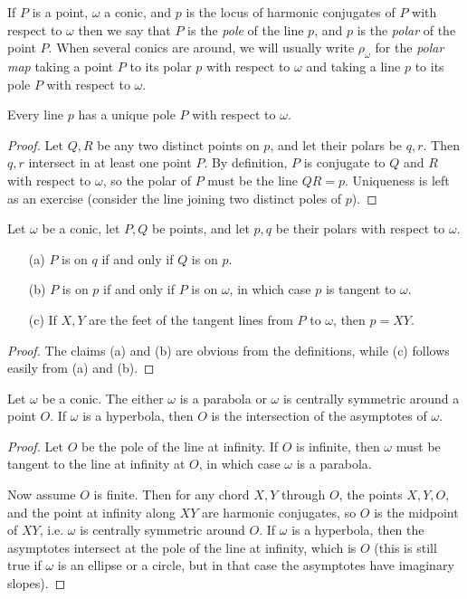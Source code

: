 \begin{defn} If $P$ is a point, $\omega$ a conic, and $p$ is the locus of harmonic conjugates of $P$ with respect to $\omega$ then we say that $P$ is the \emph{pole} of the line $p$, and $p$ is the \emph{polar} of the point $P$. When several conics are around, we will usually write $\rho_\omega$ for the \emph{polar map} taking a point $P$ to its polar $p$ with respect to $\omega$ and taking a line $p$ to its pole $P$ with respect to $\omega$.
\end{defn}

\begin{prop} Every line $p$ has a unique pole $P$ with respect to $\omega$.
\end{prop}
\begin{proof} Let $Q,R$ be any two distinct points on $p$, and let their polars be $q, r$. Then $q,r$ intersect in at least one point $P$. By definition, $P$ is conjugate to $Q$ and $R$ with respect to $\omega$, so the polar of $P$ must be the line $QR = p$. Uniqueness is left as an exercise (consider the line joining two distinct poles of $p$).
\end{proof}

\begin{prop} Let $\omega$ be a conic, let $P,Q$ be points, and let $p,q$ be their polars with respect to $\omega$.
\begin{itemize}
\item[(a)] $P$ is on $q$ if and only if $Q$ is on $p$.
\item[(b)] $P$ is on $p$ if and only if $P$ is on $\omega$, in which case $p$ is tangent to $\omega$.
\item[(c)] If $X,Y$ are the feet of the tangent lines from $P$ to $\omega$, then $p = XY$.
\end{itemize}
\end{prop}
\begin{proof} The claims (a) and (b) are obvious from the definitions, while (c) follows easily from (a) and (b).
\end{proof}

\begin{prop} Let $\omega$ be a conic. The either $\omega$ is a parabola or $\omega$ is centrally symmetric around a point $O$. If $\omega$ is a hyperbola, then $O$ is the intersection of the asymptotes of $\omega$.
\end{prop}
\begin{proof} Let $O$ be the pole of the line at infinity. If $O$ is infinite, then $\omega$ must be tangent to the line at infinity at $O$, in which case $\omega$ is a parabola.

Now assume $O$ is finite. Then for any chord $X,Y$ through $O$, the points $X,Y,O,$ and the point at infinity along $XY$ are harmonic conjugates, so $O$ is the midpoint of $XY$, i.e. $\omega$ is centrally symmetric around $O$. If $\omega$ is a hyperbola, then the asymptotes intersect at the pole of the line at infinity, which is $O$ (this is still true if $\omega$ is an ellipse or a circle, but in that case the asymptotes have imaginary slopes).
\end{proof}


